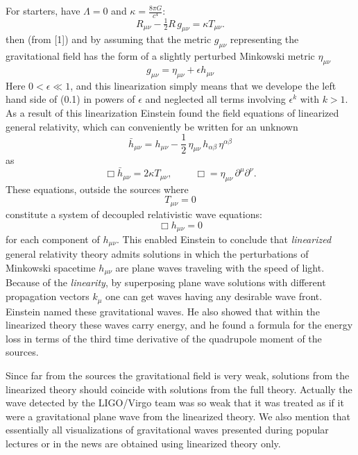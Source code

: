 \documentclass[11pt,a4paper]{article}
\begin{document}
For starters, have $\Lambda = 0$ and $\kappa = \frac{8\pi G}{c^{4}}$:  
\begin{equation}
  R_{\mu \nu }-{\tfrac {1}{2}}R\,g_{\mu \nu } = \kappa T_{\mu \nu }.
\end{equation}
then (from [1]) and by assuming that the metric $g_{\mu \nu }$
representing the gravitational field has the form of a slightly
perturbed Minkowski metric $\eta_{\mu \nu }$
\begin{equation}
  g_{\mu \nu } = \eta_{\mu \nu } + \epsilon h_{\mu \nu }
\end{equation}
Here $0< \epsilon \ll 1$, and this linearization simply means that we
develope the left hand side of (0.1) in powers of $\epsilon$ and
neglected all terms involving $\epsilon^k$ with $k > 1$. As a result of this
linearization Einstein found the field equations of linearized general
relativity, which can conveniently be written for an unknown
\begin{equation}
    \bar{h}_{\mu \nu } = h_{\mu \nu } - \frac{1}{2} \, \eta_{\mu \nu } \, h_{\alpha \beta } \, \eta^{\alpha \beta } 
\end{equation}
as
\begin{equation}
    \Box \bar{h}_{\mu \nu } = 2 \kappa T_{\mu \nu },   \; \quad \quad \Box = \eta_{\mu \nu } \,  \partial^{\mu} \partial^{\nu} .
\end{equation}
These equations, outside the sources where 
\begin{equation}
  T_{\mu \nu } = 0 
\end{equation}
constitute a system of decoupled relativistic wave equations: 
\begin{equation}
 \Box {h}_{\mu \nu }  = 0
\end{equation}
for each component of $h_{\mu \nu }$. This enabled Einstein to conclude that
{\it linearized} general relativity theory admits solutions in which the
perturbations of Minkowski spacetime $h_{\mu \nu }$ are plane waves traveling
with the speed of light. Because of the {\it linearity}, by superposing
plane wave solutions with different propagation vectors $k_\mu$ one can
get waves having any desirable wave front. Einstein named these
gravitational waves. He also showed that within the linearized theory
these waves carry energy, and he found a formula for the energy loss
in terms of the third time derivative of the quadrupole moment of the
sources.  

Since far from the sources the gravitational field is very
weak, solutions from the linearized theory should coincide with
solutions from the full theory. Actually the wave detected by the
LIGO/Virgo team was so weak that it was treated as if it were a
gravitational plane wave from the linearized theory. We also mention
that essentially all visualizations of gravitational waves presented
during popular lectures or in the news are obtained using linearized
theory only.
\end{document}
